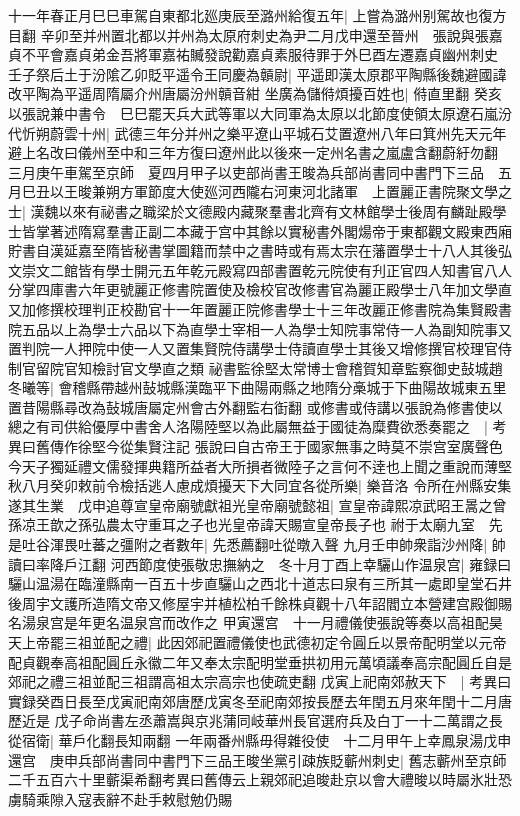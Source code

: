 十一年春正月巳巳車駕自東都北廵庚辰至潞州給復五年|{
	上嘗為潞州别駕故也復方目翻}
辛卯至并州置北都以并州為太原府刺史為尹二月戊申還至晉州　張說與張嘉貞不平會嘉貞弟金吾將軍嘉祐贓發說勸嘉貞素服待罪于外巳酉左遷嘉貞幽州刺史　壬子祭后土于汾隂乙卯貶平遥令王同慶為贑尉|{
	平遥即漢太原郡平陶縣後魏避國諱改平陶為平遥周隋屬介州唐屬汾州贑音紺}
坐廣為儲偫煩擾百姓也|{
	偫直里翻}
癸亥以張說兼中書令　巳巳罷天兵大武等軍以大同軍為太原以北節度使領太原遼石嵐汾代忻朔蔚雲十州|{
	武德三年分并州之樂平遼山平城石艾置遼州八年曰箕州先天元年避上名改曰儀州至中和三年方復曰遼州此以後來一定州名書之嵐盧含翻蔚紆勿翻}
三月庚午車駕至京師　夏四月甲子以吏部尚書王晙為兵部尚書同中書門下三品　五月巳丑以王晙兼朔方軍節度大使廵河西隴右河東河北諸軍　上置麗正書院聚文學之士|{
	漢魏以來有祕書之職梁於文德殿内藏聚羣書北齊有文林館學士後周有麟趾殿學士皆掌著述隋寫羣書正副二本藏于宫中其餘以實秘書外閣煬帝于東都觀文殿東西廂貯書自漢延嘉至隋皆秘書掌圖籍而禁中之書時或有焉太宗在藩置學士十八人其後弘文崇文二館皆有學士開元五年乾元殿寫四部書置乾元院使有刋正官四人知書官八人分掌四庫書六年更號麗正修書院置使及檢校官改修書官為麗正殿學士八年加文學直又加修撰校理判正校勘官十一年置麗正院修書學士十三年改麗正修書院為集賢殿書院五品以上為學士六品以下為直學士宰相一人為學士知院事常侍一人為副知院事又置判院一人押院中使一人又置集賢院侍講學士侍讀直學士其後又增修撰官校理官侍制官留院官知檢討官文學直之類}
祕書監徐堅太常博士會稽賀知章監察御史鼔城趙冬曦等|{
	會稽縣帶越州鼔城縣漢臨平下曲陽兩縣之地隋分槀城于下曲陽故城東五里置昔陽縣尋改為鼔城唐屬定州會古外翻監右衘翻}
或修書或侍講以張說為修書使以總之有司供給優厚中書舍人洛陽陸堅以為此屬無益于國徒為糜費欲悉奏罷之　|{
	考異曰舊傳作徐堅今從集賢注記}
張說曰自古帝王于國家無事之時莫不崇宫室廣聲色今天子獨延禮文儒發揮典籍所益者大所損者微陸子之言何不逹也上聞之重說而薄堅　秋八月癸卯敕前令檢括逃人慮成煩擾天下大同宜各從所樂|{
	樂音洛}
令所在州縣安集遂其生業　戊申追尊宣皇帝廟號獻祖光皇帝廟號懿祖|{
	宣皇帝諱熙凉武昭王暠之曾孫凉王歆之孫弘農太守重耳之子也光皇帝諱天賜宣皇帝長子也}
祔于太廟九室　先是吐谷渾畏吐蕃之彊附之者數年|{
	先悉薦翻吐從暾入聲}
九月壬申帥衆詣沙州降|{
	帥讀曰率降戶江翻}
河西節度使張敬忠撫納之　冬十月丁酉上幸驪山作温泉宫|{
	雍録曰驪山温湯在臨潼縣南一百五十步直驪山之西北十道志曰泉有三所其一處即皇堂石井後周宇文護所造隋文帝又修屋宇并植松柏千餘株貞觀十八年詔閻立本營建宫殿御賜名湯泉宫是年更名温泉宫而改作之}
甲寅還宫　十一月禮儀使張說等奏以高祖配昊天上帝罷三祖並配之禮|{
	此因郊祀置禮儀使也武德初定令圓丘以景帝配明堂以元帝配貞觀奉高祖配圓丘永徽二年又奉太宗配明堂垂拱初用元萬頃議奉高宗配圓丘自是郊祀之禮三祖並配三祖謂高祖太宗高宗也使疏吏翻}
戊寅上祀南郊赦天下　|{
	考異曰實録癸酉日長至戊寅祀南郊唐歷戊寅冬至祀南郊按長歷去年閏五月來年閏十二月唐歷近是}
戊子命尚書左丞蕭嵩與京兆蒲同岐華州長官選府兵及白丁一十二萬謂之長從宿衛|{
	華戶化翻長知兩翻}
一年兩番州縣毋得雜役使　十二月甲午上幸鳳泉湯戊申還宫　庚申兵部尚書同中書門下三品王晙坐黨引疎族貶蘄州刺史|{
	舊志蘄州至京師二千五百六十里蘄渠希翻考異曰舊傳云上親郊祀追晙赴京以會大禮晙以時屬氷壯恐虜騎乘隙入寇表辭不赴手敕慰勉仍賜}


